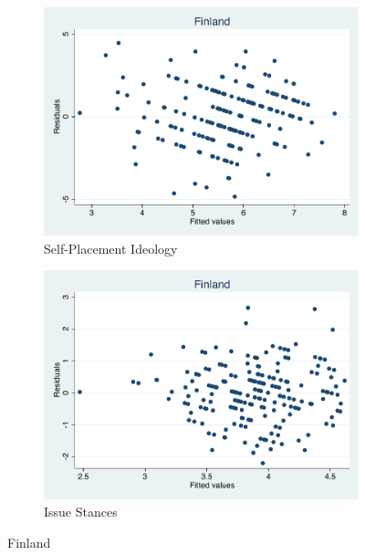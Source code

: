 \documentclass[12pt, titlepage]{article}
\begin{document}
\begin{figure}[H]
	\centering
	\begin{subfigure}[b]{0.475\textwidth}   
		\centering 
		\includegraphics[width=\textwidth]{Residuals/CountryIdeo/Finland}
		\caption{Self-Placement Ideology}
	\end{subfigure}
	\hfill
	\begin{subfigure}[b]{0.475\textwidth}
		\centering 
		\includegraphics[width=\textwidth]{Residuals/CountryLib/Finland}
		\caption{Issue Stances}
	\end{subfigure}
	\caption{Finland}
	\label{Finland}
\end{figure}
\end{document}
